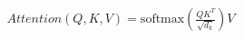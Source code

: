 \documentclass[preview]{standalone}
\begin{document}
\begin{align*}
Attention(Q, K, V) = \text{softmax}\left(\frac{QK^T}{\sqrt{d_k}}\right)V
\end{align*}
\end{document}
